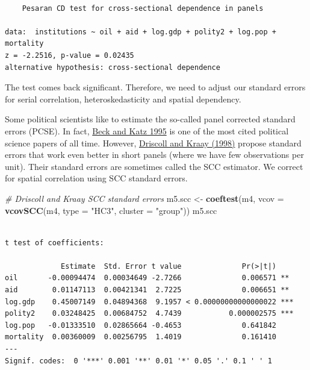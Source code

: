 \documentclass[]{article}
\newenvironment{Shaded}{\begin{snugshade}}{\end{snugshade}}
\newcommand{\KeywordTok}[1]{\textcolor[rgb]{0.13,0.29,0.53}{\textbf{#1}}}
\newcommand{\DataTypeTok}[1]{\textcolor[rgb]{0.13,0.29,0.53}{#1}}
\newcommand{\StringTok}[1]{\textcolor[rgb]{0.31,0.60,0.02}{#1}}
\newcommand{\CommentTok}[1]{\textcolor[rgb]{0.56,0.35,0.01}{\textit{#1}}}
\newcommand{\NormalTok}[1]{#1}
\theoremstyle{definition}
\theoremstyle{definition}
\theoremstyle{definition}
\theoremstyle{remark}
\begin{document}
\begin{verbatim}

    Pesaran CD test for cross-sectional dependence in panels

data:  institutions ~ oil + aid + log.gdp + polity2 + log.pop + mortality
z = -2.2516, p-value = 0.02435
alternative hypothesis: cross-sectional dependence
\end{verbatim}

The test comes back significant. Therefore, we need to adjust our
standard errors for serial correlation, heteroskedasticity and spatial
dependency.

Some political scientists like to estimate the so-called panel corrected
standard errors (PCSE). In fact,
\href{https://www.cambridge.org/core/journals/american-political-science-review/article/what-to-do-and-not-to-do-with-timeseries-crosssection-data/0E778B85AB008DAF8D13E0AC63505E37}{Beck
and Katz 1995} is one of the most cited political science papers of all
time. However,
\href{https://www.mitpressjournals.org/doi/abs/10.1162/003465398557825?casa_token=vV9SnvSYao0AAAAA:7wxGG2rWdlkyrCEAmjZ_5jT0fVmr-zvW7mOl9tjr9JN0zaEeH0yV-kIdGIZyVzZ9YIJpL9Qjgdc}{Driscoll
and Kraay (1998)} propose standard errors that work even better in short
panels (where we have few observations per unit). Their standard errors
are sometimes called the SCC estimator. We correct for spatial
correlation using SCC standard errors.

\begin{Shaded}
\begin{Highlighting}[]
\CommentTok{# Driscoll and Kraay SCC standard errors}
\NormalTok{m5.scc <-}\StringTok{ }\KeywordTok{coeftest}\NormalTok{(m4, }\DataTypeTok{vcov =} \KeywordTok{vcovSCC}\NormalTok{(m4, }\DataTypeTok{type =} \StringTok{"HC3"}\NormalTok{, }\DataTypeTok{cluster =} \StringTok{"group"}\NormalTok{))}
\NormalTok{m5.scc}
\end{Highlighting}
\end{Shaded}

\begin{verbatim}

t test of coefficients:

             Estimate  Std. Error t value              Pr(>|t|)    
oil       -0.00094474  0.00034649 -2.7266              0.006571 ** 
aid        0.01147113  0.00421341  2.7225              0.006651 ** 
log.gdp    0.45007149  0.04894368  9.1957 < 0.00000000000000022 ***
polity2    0.03248425  0.00684752  4.7439           0.000002575 ***
log.pop   -0.01333510  0.02865664 -0.4653              0.641842    
mortality  0.00360009  0.00256795  1.4019              0.161410    
---
Signif. codes:  0 '***' 0.001 '**' 0.01 '*' 0.05 '.' 0.1 ' ' 1
\end{verbatim}
\end{document}

